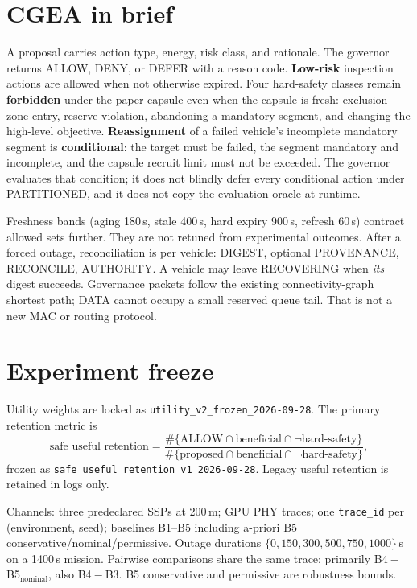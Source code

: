 \documentclass[journal]{IEEEtran}
\begin{document}
\section{CGEA in brief}

A proposal carries action type, energy, risk class, and rationale. The governor returns ALLOW, DENY, or DEFER with a reason code. \textbf{Low-risk} inspection actions are allowed when not otherwise expired. Four hard-safety classes remain \textbf{forbidden} under the paper capsule even when the capsule is fresh: exclusion-zone entry, reserve violation, abandoning a mandatory segment, and changing the high-level objective. \textbf{Reassignment} of a failed vehicle's incomplete mandatory segment is \textbf{conditional}: the target must be failed, the segment mandatory and incomplete, and the capsule recruit limit must not be exceeded. The governor evaluates that condition; it does not blindly defer every conditional action under PARTITIONED, and it does not copy the evaluation oracle at runtime.

Freshness bands (aging 180\,s, stale 400\,s, hard expiry 900\,s, refresh 60\,s) contract allowed sets further. They are not retuned from experimental outcomes. After a forced outage, reconciliation is per vehicle: DIGEST, optional PROVENANCE, RECONCILE, AUTHORITY. A vehicle may leave RECOVERING when \emph{its} digest succeeds. Governance packets follow the existing connectivity-graph shortest path; DATA cannot occupy a small reserved queue tail. That is not a new MAC or routing protocol.

\section{Experiment freeze}

Utility weights are locked as \texttt{utility\_v2\_frozen\_2026-09-28}. The primary retention metric is
\[
\text{safe useful retention}
=
\frac{
\#\{\text{ALLOW}\cap\text{beneficial}\cap\neg\text{hard-safety}\}
}{
\#\{\text{proposed}\cap\text{beneficial}\cap\neg\text{hard-safety}\}
},
\]
frozen as \texttt{safe\_useful\_retention\_v1\_2026-09-28}. Legacy useful retention is retained in logs only.

Channels: three predeclared SSPs at 200\,m; GPU PHY traces; one \texttt{trace\_id} per (environment, seed); baselines B1--B5 including a-priori B5 conservative/nominal/permissive. Outage durations $\{0,150,300,500,750,1000\}$\,s on a 1400\,s mission. Pairwise comparisons share the same trace: primarily B4${}-{}$B5$_{\text{nominal}}$, also B4${}-{}$B3. B5 conservative and permissive are robustness bounds.
\end{document}
